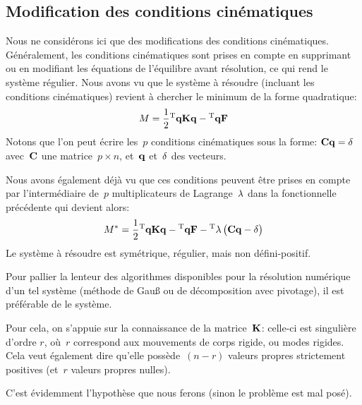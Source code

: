 \medskip
\subsection{Modification des conditions cinématiques}

Nous ne considérons ici que des modifications des conditions cinématiques. Généralement, les conditions cinématiques sont prises en compte en supprimant ou en modifiant les équations de l'équilibre avant résolution, ce qui rend le système régulier. Nous avons vu que le système à résoudre (incluant les conditions cinématiques) revient à chercher le minimum de la forme quadratique:
\begin{equation}M=\frac12 \LL{q}\MM{K}\VV{q} -\LL{q}\VV{F}\end{equation}
Notons que l'on peut écrire les~$p$ conditions cinématiques sous la forme:
$\MM{C}\VV{q} = \VV{\delta}$
avec~$\MM{C}$ une matrice~$p\times n$, et~$\VV{q}$ et~$\VV{\delta}$ des vecteurs.

Nous avons également déjà vu que ces conditions peuvent être prises en compte par l'intermédiaire de~$p$ multiplicateurs de Lagrange~$\VV{\lambda}$ dans la fonctionnelle précédente qui devient alors:
\begin{equation}
M^*=\frac12 \LL{q}\MM{K}\VV{q} -\LL{q}\VV{F} - \LL{\lambda}\PP{\MM{C}\VV{q} - \VV{\delta}}
\end{equation}
Le système à résoudre est symétrique, régulier, mais non défini-positif.

\medskip
Pour pallier la lenteur des algorithmes disponibles pour la résolution numérique d'un tel système (méthode de Gauß ou de décomposition avec pivotage), il est préférable de  le système.

Pour cela, on s'appuie sur la connaissance de la matrice~$\MM{K}$: celle-ci est singulière d'ordre $r$, où~$r$ correspond aux mouvements de corps rigide, ou modes rigides. Cela veut également dire qu'elle possède~$(n-r)$ valeurs propres strictement positives (et~$r$ valeurs propres nulles).

 C'est évidemment l'hypothèse que nous ferons (sinon le problème est mal posé).

